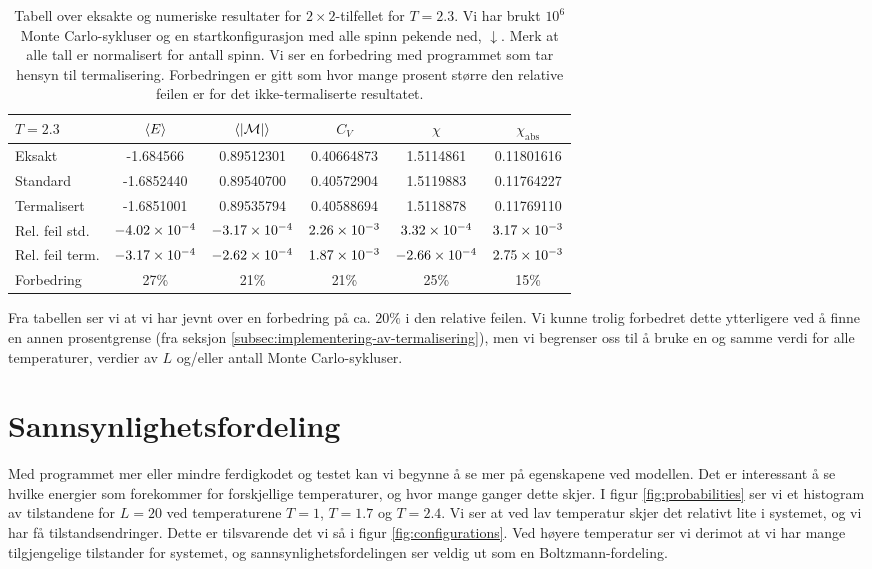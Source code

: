 \documentclass[11pt, twocolumn]{article}
\newcommand{\abs}[1]{|#1|}
\begin{document}
\begin{table}
\centering
\caption{Tabell over eksakte og numeriske resultater for $2\times
  2$-tilfellet for $T=2.3$. Vi har brukt $10^6$ Monte Carlo-sykluser og
  en startkonfigurasjon med alle spinn pekende ned, $\downarrow$. Merk at
alle tall er normalisert for antall spinn. Vi ser en forbedring
med programmet som tar hensyn til termalisering. Forbedringen er gitt
som hvor mange prosent større den relative feilen er for det
ikke-termaliserte resultatet.}
\label{tab:exact-numerical-improved}
\vspace{0.1cm}
\begin{tabular}{l|ccccc}
$T=2.3$ & $\langle E \rangle$ & $\mean{ \abs{\mathcal{M} } }$ & $C_V$ & $\chi$ & $\chi_\text{abs}$ \\
\hline
Eksakt          & -1.684566     & 0.89512301    & 0.40664873   & 1.5114861 & 0.11801616 \\
Standard        & -1.6852440    & 0.89540700    & 0.40572904   & 1.5119883 & 0.11764227 \\
Termalisert     & -1.6851001    & 0.89535794    & 0.40588694   & 1.5118878 & 0.11769110\\
Rel. feil std.  & $-4.02\times 10^{-4}$ & $-3.17\times 10^{-4}$ & $2.26\times 10^{-3}$ & $3.32\times 10^{-4}$ & $3.17\times 10^{-3}$ \\
Rel. feil term. & $-3.17\times 10^{-4}$ & $-2.62\times 10^{-4}$ & $1.87\times 10^{-3}$ &
                                                                 $-2.66\times 10^{-4}$ & $2.75\times 10^{-3}$\\
Forbedring  & 27\% & 21\% & 21\% & 25\% & 15\%
\end{tabular}
\end{table}

Fra tabellen ser vi at vi har jevnt over en forbedring på ca. $20\%$ i
den relative feilen. Vi kunne trolig forbedret dette ytterligere ved å
finne en annen prosentgrense (fra seksjon
\ref{subsec:implementering-av-termalisering}), men vi begrenser oss
til å bruke en og samme verdi for alle temperaturer, verdier av
$L$ og/eller antall Monte Carlo-sykluser. 

\section{Sannsynlighetsfordeling}
Med programmet mer eller mindre ferdigkodet og testet kan vi begynne
å se mer på egenskapene ved modellen. Det er interessant å se hvilke
energier som forekommer for forskjellige temperaturer, og hvor mange ganger dette skjer.
I figur \ref{fig:probabilities} ser vi et histogram av tilstandene
for $L=20$ ved temperaturene $T=1$, $T=1.7$ og $T=2.4$. Vi ser at ved lav temperatur
skjer det relativt lite i systemet, og vi har få tilstandsendringer. 
Dette er tilsvarende
det vi så i figur \ref{fig:configurations}. Ved høyere temperatur ser vi derimot
at vi har mange tilgjengelige tilstander for systemet, og 
sannsynlighetsfordelingen ser veldig ut som en Boltzmann-fordeling.
\end{document}
